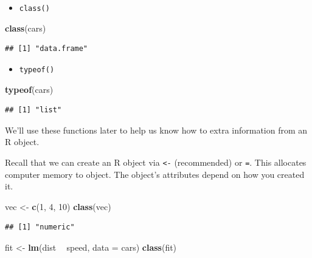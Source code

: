 \documentclass[
]{book}
\newenvironment{Shaded}{\begin{snugshade}}{\end{snugshade}}
\newcommand{\DataTypeTok}[1]{\textcolor[rgb]{0.13,0.29,0.53}{#1}}
\newcommand{\DecValTok}[1]{\textcolor[rgb]{0.00,0.00,0.81}{#1}}
\newcommand{\KeywordTok}[1]{\textcolor[rgb]{0.13,0.29,0.53}{\textbf{#1}}}
\newcommand{\NormalTok}[1]{#1}
\newcommand{\OperatorTok}[1]{\textcolor[rgb]{0.81,0.36,0.00}{\textbf{#1}}}
\newcommand{\StringTok}[1]{\textcolor[rgb]{0.31,0.60,0.02}{#1}}
\providecommand{\tightlist}{%
  \setlength{\itemsep}{0pt}\setlength{\parskip}{0pt}}
\theoremstyle{definition}
\theoremstyle{definition}
\theoremstyle{definition}
\theoremstyle{remark}
\begin{document}
\begin{itemize}
\tightlist
\item
  \texttt{class()}
\end{itemize}

\begin{Shaded}
\begin{Highlighting}[]
\KeywordTok{class}\NormalTok{(cars)}
\end{Highlighting}
\end{Shaded}

\begin{verbatim}
## [1] "data.frame"
\end{verbatim}

\begin{itemize}
\tightlist
\item
  \texttt{typeof()}
\end{itemize}

\begin{Shaded}
\begin{Highlighting}[]
\KeywordTok{typeof}\NormalTok{(cars)}
\end{Highlighting}
\end{Shaded}

\begin{verbatim}
## [1] "list"
\end{verbatim}

We'll use these functions later to help us know how to extra information from an R object.

Recall that we can create an R object via \texttt{\textless{}-} (recommended) or \texttt{=}. This allocates computer memory to object. The object's attributes depend on how you created it.

\begin{Shaded}
\begin{Highlighting}[]
\NormalTok{vec <-}\StringTok{ }\KeywordTok{c}\NormalTok{(}\DecValTok{1}\NormalTok{, }\DecValTok{4}\NormalTok{, }\DecValTok{10}\NormalTok{)}
\KeywordTok{class}\NormalTok{(vec)}
\end{Highlighting}
\end{Shaded}

\begin{verbatim}
## [1] "numeric"
\end{verbatim}

\begin{Shaded}
\begin{Highlighting}[]
\NormalTok{fit <-}\StringTok{ }\KeywordTok{lm}\NormalTok{(dist }\OperatorTok{~}\StringTok{ }\NormalTok{speed, }\DataTypeTok{data =}\NormalTok{ cars)}
\KeywordTok{class}\NormalTok{(fit)}
\end{Highlighting}
\end{Shaded}
\end{document}
